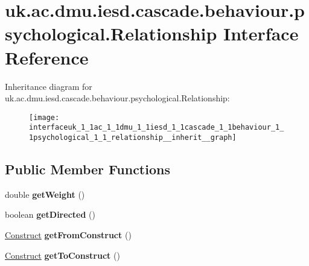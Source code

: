 \hypertarget{interfaceuk_1_1ac_1_1dmu_1_1iesd_1_1cascade_1_1behaviour_1_1psychological_1_1_relationship}{\section{uk.\-ac.\-dmu.\-iesd.\-cascade.\-behaviour.\-psychological.\-Relationship Interface Reference}
\label{interfaceuk_1_1ac_1_1dmu_1_1iesd_1_1cascade_1_1behaviour_1_1psychological_1_1_relationship}
}


Inheritance diagram for uk.\-ac.\-dmu.\-iesd.\-cascade.\-behaviour.\-psychological.\-Relationship\-:\nopagebreak
\begin{figure}[H]
\begin{center}
\leavevmode
\texttt{[image: interfaceuk\_1\_1ac\_1\_1dmu\_1\_1iesd\_1\_1cascade\_1\_1behaviour\_1\_1psychological\_1\_1\_relationship\_\_inherit\_\_graph]}
\end{center}
\end{figure}
\subsection*{Public Member Functions}
\begin{DoxyCompactItemize}
\item 
\hypertarget{interfaceuk_1_1ac_1_1dmu_1_1iesd_1_1cascade_1_1behaviour_1_1psychological_1_1_relationship_aff245c2bae213e2c7eb087bae599a3b6}{double {\bfseries get\-Weight} ()}\label{interfaceuk_1_1ac_1_1dmu_1_1iesd_1_1cascade_1_1behaviour_1_1psychological_1_1_relationship_aff245c2bae213e2c7eb087bae599a3b6}

\item 
\hypertarget{interfaceuk_1_1ac_1_1dmu_1_1iesd_1_1cascade_1_1behaviour_1_1psychological_1_1_relationship_a58b452c5d1a8ac36521ecd3139fe479e}{boolean {\bfseries get\-Directed} ()}\label{interfaceuk_1_1ac_1_1dmu_1_1iesd_1_1cascade_1_1behaviour_1_1psychological_1_1_relationship_a58b452c5d1a8ac36521ecd3139fe479e}

\item 
\hypertarget{interfaceuk_1_1ac_1_1dmu_1_1iesd_1_1cascade_1_1behaviour_1_1psychological_1_1_relationship_a936878a129114ff9d5230ff3d9572e12}{\hyperlink{interfaceuk_1_1ac_1_1dmu_1_1iesd_1_1cascade_1_1behaviour_1_1psychological_1_1_construct}{Construct} {\bfseries get\-From\-Construct} ()}\label{interfaceuk_1_1ac_1_1dmu_1_1iesd_1_1cascade_1_1behaviour_1_1psychological_1_1_relationship_a936878a129114ff9d5230ff3d9572e12}

\item 
\hypertarget{interfaceuk_1_1ac_1_1dmu_1_1iesd_1_1cascade_1_1behaviour_1_1psychological_1_1_relationship_a77558f247f1b32129b0005027b8e14f5}{\hyperlink{interfaceuk_1_1ac_1_1dmu_1_1iesd_1_1cascade_1_1behaviour_1_1psychological_1_1_construct}{Construct} {\bfseries get\-To\-Construct} ()}\label{interfaceuk_1_1ac_1_1dmu_1_1iesd_1_1cascade_1_1behaviour_1_1psychological_1_1_relationship_a77558f247f1b32129b0005027b8e14f5}

\end{DoxyCompactItemize}


